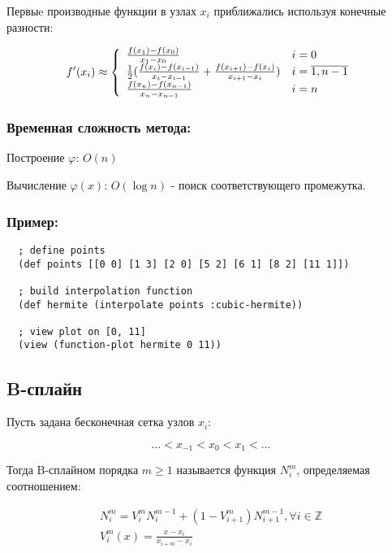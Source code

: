 \noindent Первыe производные функции в узлах $x_i$ приближались используя конечные разности:

\begin{equation}
  f'(x_i) \approx \left\{
  \begin{array}{l l}
    \frac{f(x_1) - f(x_0)}{x_1 - x_0} & i = 0 \\
    \frac{1}{2}(\frac{f(x_i) - f(x_{i-1})}{x_i - x_{i-1}} + \frac{f(x_{i+1}) - f(x_i)}{x_{i+1} - x_i}) & i = \overline{1, n-1} \\
    \frac{f(x_n) - f(x_{n-1})}{x_n - x_{n-1}} & i = n
  \end{array}
  \right.
\end{equation}

\subsubsection{Временная сложность метода:}

Построение $\varphi$: $O(n)$

Вычисление $\varphi(x)$: $O(\log n)$ - поиск соответствующего промежутка.

\subsubsection{Пример:}

\begin{verbatim}
  ; define points
  (def points [[0 0] [1 3] [2 0] [5 2] [6 1] [8 2] [11 1]])

  ; build interpolation function
  (def hermite (interpolate points :cubic-hermite))

  ; view plot on [0, 11]
  (view (function-plot hermite 0 11))
\end{verbatim}



\subsection{B-сплайн}

Пусть задана бесконечная сетка узлов ${x_i}$:

\[
\ldots < x_{-1} < x_0 < x_1 < \ldots
\]

Тогда B-сплайном порядка $m \geq 1$ называется функция $N^m_i$, определяемая соотношением:

\begin{equation}
  \begin{gathered}
    N^m_i = V^m_i N^{m-1}_i + (1 - V^m_{i+1}) N^{m-1}_{i+1}, \forall i \in \mathbb{Z} \\
    V^m_i(x) = \frac{x - x_i}{x_{i+m} - x_i}
  \end{gathered}
\end{equation}

